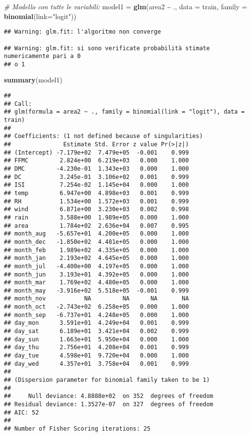 \documentclass[
]{article}
\newenvironment{Shaded}{\begin{snugshade}}{\end{snugshade}}
\newcommand{\AttributeTok}[1]{\textcolor[rgb]{0.13,0.29,0.53}{#1}}
\newcommand{\CommentTok}[1]{\textcolor[rgb]{0.56,0.35,0.01}{\textit{#1}}}
\newcommand{\FunctionTok}[1]{\textcolor[rgb]{0.13,0.29,0.53}{\textbf{#1}}}
\newcommand{\NormalTok}[1]{#1}
\newcommand{\OtherTok}[1]{\textcolor[rgb]{0.56,0.35,0.01}{#1}}
\newcommand{\SpecialCharTok}[1]{\textcolor[rgb]{0.81,0.36,0.00}{\textbf{#1}}}
\newcommand{\StringTok}[1]{\textcolor[rgb]{0.31,0.60,0.02}{#1}}
\begin{document}
\begin{Shaded}
\begin{Highlighting}[]
\CommentTok{\# Modello con tutte le variabili:}
\NormalTok{model1 }\OtherTok{=} \FunctionTok{glm}\NormalTok{(area2 }\SpecialCharTok{\textasciitilde{}}\NormalTok{ ., }\AttributeTok{data =}\NormalTok{ train, }\AttributeTok{family =} \FunctionTok{binomial}\NormalTok{(}\AttributeTok{link=}\StringTok{"logit"}\NormalTok{))}
\end{Highlighting}
\end{Shaded}

\begin{verbatim}
## Warning: glm.fit: l'algoritmo non converge

## Warning: glm.fit: si sono verificate probabilità stimate numericamente pari a 0
## o 1
\end{verbatim}

\begin{Shaded}
\begin{Highlighting}[]
\FunctionTok{summary}\NormalTok{(model1)}
\end{Highlighting}
\end{Shaded}

\begin{verbatim}
## 
## Call:
## glm(formula = area2 ~ ., family = binomial(link = "logit"), data = train)
## 
## Coefficients: (1 not defined because of singularities)
##               Estimate Std. Error z value Pr(>|z|)
## (Intercept) -7.179e+02  7.479e+05  -0.001    0.999
## FFMC         2.824e+00  6.219e+03   0.000    1.000
## DMC         -4.230e-01  1.343e+03   0.000    1.000
## DC           3.245e-01  3.106e+02   0.001    0.999
## ISI          7.254e-02  1.145e+04   0.000    1.000
## temp         6.947e+00  4.898e+03   0.001    0.999
## RH           1.534e+00  1.572e+03   0.001    0.999
## wind         6.871e+00  3.230e+03   0.002    0.998
## rain         3.588e+00  1.989e+05   0.000    1.000
## area         1.784e+02  2.636e+04   0.007    0.995
## month_aug   -5.657e+01  4.200e+05   0.000    1.000
## month_dec   -1.850e+02  4.481e+05   0.000    1.000
## month_feb    1.989e+02  4.335e+05   0.000    1.000
## month_jan    2.193e+02  4.645e+05   0.000    1.000
## month_jul   -4.400e+00  4.197e+05   0.000    1.000
## month_jun    3.193e+01  4.392e+05   0.000    1.000
## month_mar    1.769e+02  4.480e+05   0.000    1.000
## month_may   -3.916e+02  5.518e+05  -0.001    0.999
## month_nov           NA         NA      NA       NA
## month_oct   -2.743e+02  6.258e+05   0.000    1.000
## month_sep   -6.737e+01  4.248e+05   0.000    1.000
## day_mon      3.591e+01  4.249e+04   0.001    0.999
## day_sat      6.189e+01  3.421e+04   0.002    0.999
## day_sun      1.663e+01  5.950e+04   0.000    1.000
## day_thu      2.756e+01  4.208e+04   0.001    0.999
## day_tue      4.598e+01  9.720e+04   0.000    1.000
## day_wed      4.357e+01  3.758e+04   0.001    0.999
## 
## (Dispersion parameter for binomial family taken to be 1)
## 
##     Null deviance: 4.8888e+02  on 352  degrees of freedom
## Residual deviance: 1.3527e-07  on 327  degrees of freedom
## AIC: 52
## 
## Number of Fisher Scoring iterations: 25
\end{verbatim}
\end{document}
